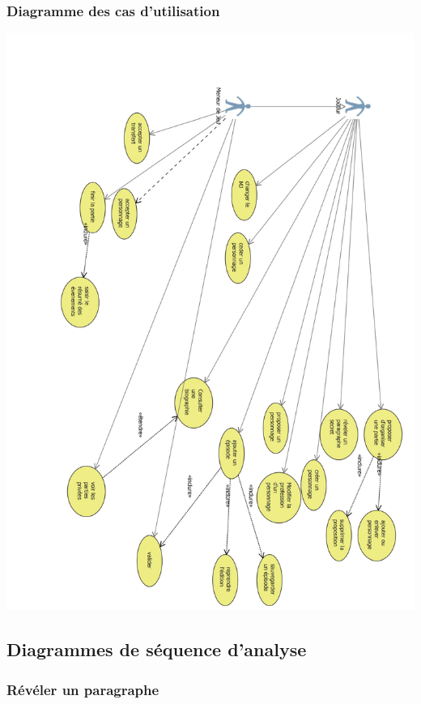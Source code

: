 \documentclass[a4paper, 11pt, titlepage]{article}
\begin{document}
\subsubsection{Diagramme des cas d'utilisation}

\begin{center}
    \includegraphics[scale=0.7]{analyse/cadutilisation}
\end{center}


\newpage
\subsection{Diagrammes de séquence d'analyse}

\subsubsection{Révéler un paragraphe}
\end{document}
